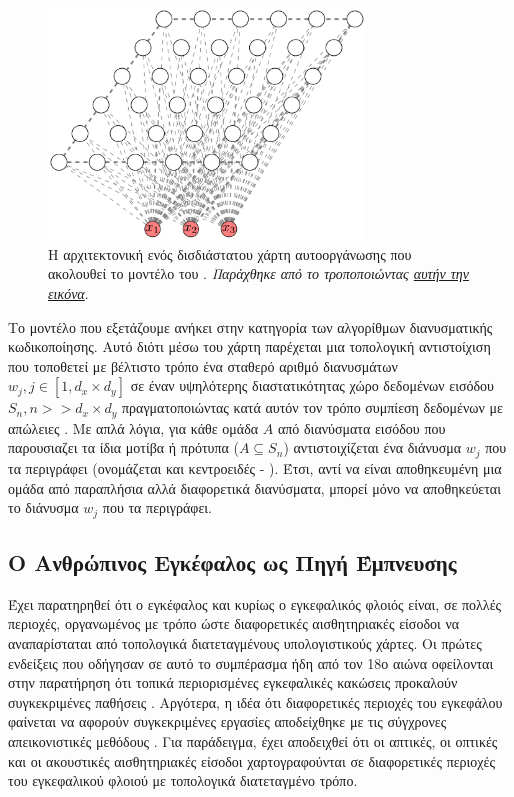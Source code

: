 \begin{figure}[h]
  \centering
  \includegraphics[width=0.75\textwidth]{images/chapter theoritical background/Self-organizing-map.pdf}
  \caption{Η αρχιτεκτονική ενός δισδιάστατου χάρτη αυτο\textendash οργάνωσης που ακολουθεί το μοντέλο του . \textit{Παράχθηκε από το \href{https://inkscape.org/}{} τροποποιώντας \href{https://commons.wikimedia.org/wiki/File:Self-organizing-map.svg}{αυτήν την εικόνα}}.}
  \label{fig:SOM}
\end{figure}

Το μοντέλο  που εξετάζουμε ανήκει στην κατηγορία των αλγορίθμων διανυσματικής κωδικοποίησης. Αυτό διότι μέσω του χάρτη  παρέχεται μια τοπολογική αντιστοίχιση που τοποθετεί με βέλτιστο τρόπο ένα σταθερό αριθμό διανυσμάτων $w_j, j \in [1, d_x \times d_y]$ σε έναν υψηλότερης διαστατικότητας χώρο δεδομένων εισόδου $S_n, n >> d_x \times d_y$ πραγματοποιώντας κατά αυτόν τον τρόπο συμπίεση δεδομένων με απώλειες \cite{haykin2009neural}. Με απλά λόγια, για κάθε ομάδα $A$ από διανύσματα εισόδου που παρουσιαζει τα ίδια μοτίβα ή πρότυπα ($A \subseteq S_n$) αντιστοιχίζεται ένα διάνυσμα $w_j$ που τα περιγράφει (ονομάζεται και κεντροειδές - ). Έτσι, αντί να είναι αποθηκευμένη μια ομάδα από παραπλήσια αλλά διαφορετικά διανύσματα, μπορεί μόνο να αποθηκεύεται το διάνυσμα $w_j$ που τα περιγράφει.

\subsection{Ο Ανθρώπινος Εγκέφαλος ως Πηγή Έμπνευσης}

Έχει παρατηρηθεί ότι ο εγκέφαλος και κυρίως ο εγκεφαλικός φλοιός είναι, σε πολλές περιοχές, οργανωμένος με τρόπο ώστε διαφορετικές αισθητηριακές είσοδοι να αναπαρίσταται από τοπολογικά διατεταγμένους υπολογιστικούς χάρτες\cite{haykin2009neural}. Οι πρώτες ενδείξεις που οδήγησαν σε αυτό το συμπέρασμα ήδη από τον 18ο αιώνα \cite{finger2000minds} οφείλονται στην παρατήρηση ότι τοπικά περιορισμένες εγκεφαλικές κακώσεις προκαλούν συγκεκριμένες παθήσεις \cite{kohonen1990self, eickhoff2018topographic}. Αργότερα, η ιδέα ότι διαφορετικές περιοχές του εγκεφάλου φαίνεται να αφορούν συγκεκριμένες εργασίες αποδείχθηκε με τις σύγχρονες απεικονιστικές μεθόδους \cite{kohonen1990self}. Για παράδειγμα, έχει αποδειχθεί ότι οι απτικές, οι οπτικές και οι ακουστικές αισθητηριακές είσοδοι χαρτογραφούνται  σε διαφορετικές περιοχές του εγκεφαλικού φλοιού με τοπολογικά διατεταγμένο τρόπο\cite{haykin2009neural}.\par

